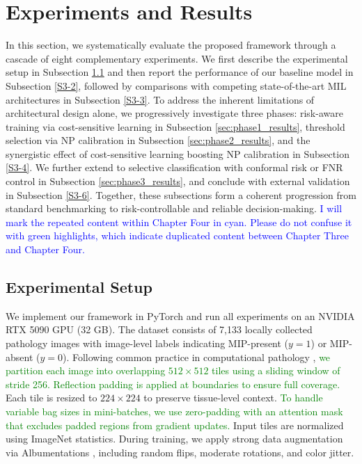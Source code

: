 \documentclass[journal,twoside,web]{ieeecolor}
\begin{document}
\section{Experiments and Results}\label{sec:experiments}

In this section, we systematically evaluate the proposed framework through a cascade of eight complementary experiments. We first describe the experimental setup in Subsection \ref{S3-1} and then report the performance of our baseline model in Subsection \ref{S3-2}, followed by comparisons with competing state-of-the-art MIL architectures in Subsection \ref{S3-3}. To address the inherent limitations of architectural design alone, we progressively investigate three phases: risk-aware training via cost-sensitive learning in Subsection \ref{sec:phase1_results}, threshold selection via NP calibration in Subsection \ref{sec:phase2_results}, and the synergistic effect of cost-sensitive learning boosting NP calibration in Subsection \ref{S3-4}. We further extend to selective classification with conformal risk or FNR control in Subsection \ref{sec:phase3_results}, and conclude with external validation in Subsection \ref{S3-6}. Together, these subsections form a coherent progression from standard benchmarking to risk-controllable and reliable decision-making.
\textcolor{blue}{I will mark the repeated content within Chapter Four in cyan. Please do not confuse it with green highlights, which indicate duplicated content between Chapter Three and Chapter Four.}
\subsection{Experimental Setup}\label{S3-1}

We implement our framework in PyTorch and run all experiments on an NVIDIA RTX 5090 GPU (32 GB). The dataset consists of 7,133 locally collected pathology images with image-level labels indicating MIP-present ($y = 1$) or MIP-absent ($y = 0$). Following common practice in computational pathology \cite{campanella2019clinical,lu2021data}, \textcolor{green}{we partition each image into overlapping $512 \times 512$ tiles using a sliding window of stride 256. Reflection padding is applied at boundaries to ensure full coverage.} Each tile is resized to $224 \times 224$ to preserve tissue-level context. \textcolor{green}{To handle variable bag sizes in mini-batches, we use zero-padding with an attention mask that excludes padded regions from gradient updates.} Input tiles are normalized using ImageNet statistics. During training, we apply strong data augmentation via Albumentations \cite{buslaev2020albumentations}, including random flips, moderate rotations, and color jitter.
\end{document}
